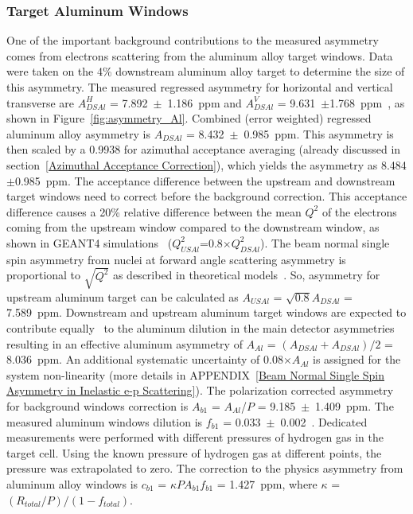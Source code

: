 \subsubsection{Target Aluminum Windows}
\label{Target Aluminum Windows}
One of the important background contributions to the measured asymmetry comes from electrons scattering from the aluminum alloy target windows. 
Data were taken on the 4\% downstream aluminum alloy target to determine the size of this asymmetry.
The measured regressed asymmetry for horizontal and vertical transverse are $A^{H}_{DSAl}$ = 7.892~$\pm$~1.186~ppm and $A^{V}_{DSAl}$ = 9.631~$\pm$1.768~ppm~\cite{elog:nur_ancillary43}, as shown in Figure~\ref{fig:asymmetry_Al}. Combined (error weighted) regressed aluminum alloy asymmetry is $A_{DSAl}$ = 8.432~$\pm$~0.985~ppm. This asymmetry is then scaled by a 0.9938 for azimuthal acceptance averaging (already discussed in section~\ref{Azimuthal Acceptance Correction}), which yields the asymmetry as 8.484$\pm$0.985~ppm. The acceptance difference between the upstream and downstream target windows need to correct before the background correction. This acceptance difference causes a 20\% relative difference between the mean $Q^{2}$ of the electrons coming from the upstream window compared to the downstream window, as shown in GEANT4 simulations~\cite{kmyers_qweak} ($Q^{2}_{USAl}$=0.8$\times Q^{2}_{DSAl}$). The beam normal single spin asymmetry from nuclei at forward angle scattering asymmetry is proportional to $\sqrt{Q^{2}}$ as described in theoretical models~\cite{PhysRevC.72.034602, PhysRevC.77.044606}. So, asymmetry for upstream aluminum target can be calculated as $A_{USAl}$ = $\sqrt{0.8} A_{DSAl}$ = 7.589~ppm. Downstream and upstream aluminum target windows are expected to contribute equally~\cite{kmyers_qweak} to the aluminum dilution in the main detector asymmetries resulting in an effective aluminum asymmetry of $A_{Al}$ =  $(A_{DSAl}+A_{DSAl})/2$ = 8.036~ppm. An additional systematic uncertainty of 0.08$\times A_{Al}$ is assigned for the system non-linearity (more details in APPENDIX~\ref{Beam Normal Single Spin Asymmetry in Inelastic e-p Scattering}). 
The polarization corrected asymmetry for background windows correction is $A_{b1}$ = $A_{Al}$/$P$ = 9.185~$\pm$~1.409~ppm.
The measured aluminum windows dilution 
is $f_{b1}$ = 0.033~$\pm$~0.002~\cite{presentation:josh_1891}. 
Dedicated measurements were performed with different pressures of hydrogen gas in the target cell. Using the known pressure of hydrogen gas at different points, the pressure was extrapolated to zero. %
The correction to the physics asymmetry from aluminum alloy windows is $c_{b1}$ = $\kappa PA_{b1}f_{b1}$ = 1.427~ppm, where $\kappa$ = $(R_{total}/P)/(1-f_{total})$.

